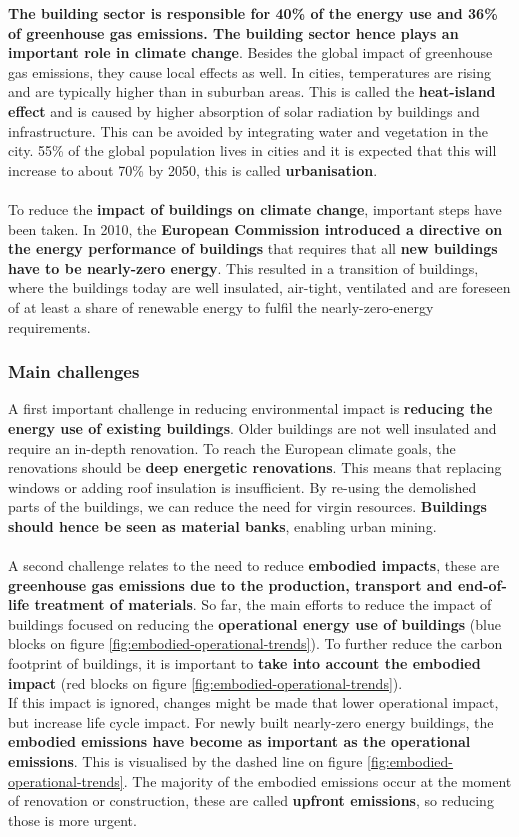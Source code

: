 \documentclass[../summary.tex]{subfiles}
\begin{document}
\textbf{The building sector is responsible for 40\% of the energy use and 36\% of greenhouse gas emissions. The building sector hence plays an important role in climate change}. Besides the global impact of greenhouse gas emissions, they cause local effects as well. In cities, temperatures are rising and are typically higher than in suburban areas. This is called the \textbf{heat-island effect} and is caused by higher absorption of solar radiation by buildings and infrastructure. This can be avoided by integrating water and vegetation in the city. 55\% of the global population lives in cities and it is expected that this will increase to about 70\% by 2050, this is called \textbf{urbanisation}.
\\\\
To reduce the \textbf{impact of buildings on climate change}, important steps have been taken. In 2010, the \textbf{European Commission introduced a directive on the energy performance of buildings} that requires that all \textbf{new buildings have to be nearly-zero energy}. This resulted in a transition of buildings, where the buildings today are well insulated, air-tight, ventilated and are foreseen of at least a share of renewable energy to fulfil the nearly-zero-energy requirements.

\subsubsection{Main challenges}

A first important challenge in reducing environmental impact is \textbf{reducing the energy use of existing buildings}. Older buildings are not well insulated and require an in-depth renovation. To reach the European climate goals, the renovations should be \textbf{deep energetic renovations}. This means that replacing windows or adding roof insulation is insufficient. By re-using the demolished parts of the buildings, we can reduce the need for virgin resources. \textbf{Buildings should hence be seen as material banks}, enabling urban mining.
\\\\
A second challenge relates to the need to reduce \textbf{embodied impacts}, these are \textbf{greenhouse gas emissions due to the production, transport and end-of-life treatment of materials}. So far, the main efforts to reduce the impact of buildings focused on reducing the \textbf{operational energy use of buildings} (blue blocks on figure \ref{fig:embodied-operational-trends}). To further reduce the carbon footprint of buildings, it is important to \textbf{take into account the embodied impact} (red blocks on figure \ref{fig:embodied-operational-trends}). \\
If this impact is ignored, changes might be made that lower operational impact, but increase life cycle impact. For newly built nearly-zero energy buildings, the \textbf{embodied emissions have become as important as the operational emissions}. This is visualised by the dashed line on figure \ref{fig:embodied-operational-trends}. The majority of the embodied emissions occur at the moment of renovation or construction, these are called \textbf{upfront emissions}, so reducing those is more urgent.
\end{document}
